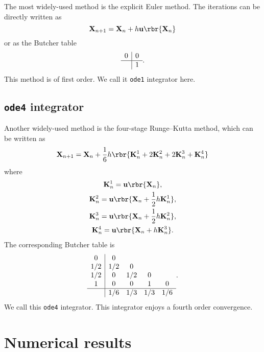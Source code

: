 \documentclass[english, nochinese]{pnote}
\begin{document}
The most widely-used method is the explicit Euler method. The iterations can be directly written as
\begin{equation}
\mathbf{X}_{ n + 1 } = \mathbf{X}_n + h \mathbf{u} \rbr{\mathbf{X}_n}
\end{equation}
or as the Butcher table
\begin{equation}
\begin{array}{c|c}
0 & 0 \\
\hline
& 1
\end{array}
.
\end{equation}
This method is of first order. We call it \verb"ode1" integrator here.

\subsection{\texttt{ode4} integrator}

Another widely-used method is the four-stage Runge--Kutta method, which can be written as
\begin{equation}
\mathbf{X}_{ n + 1 } = \mathbf{X}_n + \frac{1}{6} h \rbr{ \mathbf{K}_n^1 + 2 \mathbf{K}_n^2 + 2 \mathbf{K}_n^3 + \mathbf{K}_n^4 }
\end{equation}
where
\begin{gather}
\mathbf{K}_n^1 = \mathbf{u} \rbr{\mathbf{X}_n}, \\
\mathbf{K}_n^2 = \mathbf{u} \rbr{ \mathbf{X}_n + \frac{1}{2} h \mathbf{K}_n^1 }, \\
\mathbf{K}_n^3 = \mathbf{u} \rbr{ \mathbf{X}_n + \frac{1}{2} h \mathbf{K}_n^2 }, \\
\mathbf{K}_n^4 = \mathbf{u} \rbr{ \mathbf{X}_n + h \mathbf{K}_n^3 }.
\end{gather}
The corresponding Butcher table is
\begin{equation}
\begin{array}{c|cccc}
0 & 0 \\
1 / 2 & 1 / 2 & 0 \\
1 / 2 & 0 & 1 / 2 & 0 \\
1 & 0 & 0 & 1 & 0 \\
\hline
& 1 / 6 & 1 / 3 & 1 / 3 & 1 / 6
\end{array}
.
\end{equation}
We call this \verb"ode4" integrator. This integrator enjoys a fourth order convergence.

\section{Numerical results}
\end{document}
